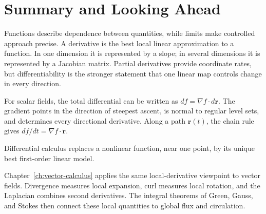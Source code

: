 \section{Summary and Looking Ahead}
\label{sec:differential-calculus-summary}

Functions describe dependence between quantities, while limits make controlled approach precise. A derivative is the best local linear approximation to a function. In one dimension it is represented by a slope; in several dimensions it is represented by a Jacobian matrix. Partial derivatives provide coordinate rates, but differentiability is the stronger statement that one linear map controls change in every direction.

For scalar fields, the total differential can be written as $df=\nabla f\cdot d\mathbf r$. The gradient points in the direction of steepest ascent, is normal to regular level sets, and determines every directional derivative. Along a path $\mathbf r(t)$, the chain rule gives $df/dt=\nabla f\cdot\dot{\mathbf r}$.

\begin{booksummary}
Differential calculus replaces a nonlinear function, near one point, by its unique best first-order linear model.
\end{booksummary}

\begin{roadmapbox}
Chapter~\ref{ch:vector-calculus} applies the same local-derivative viewpoint to vector fields. Divergence measures local expansion, curl measures local rotation, and the Laplacian combines second derivatives. The integral theorems of Green, Gauss, and Stokes then connect these local quantities to global flux and circulation.
\end{roadmapbox}
